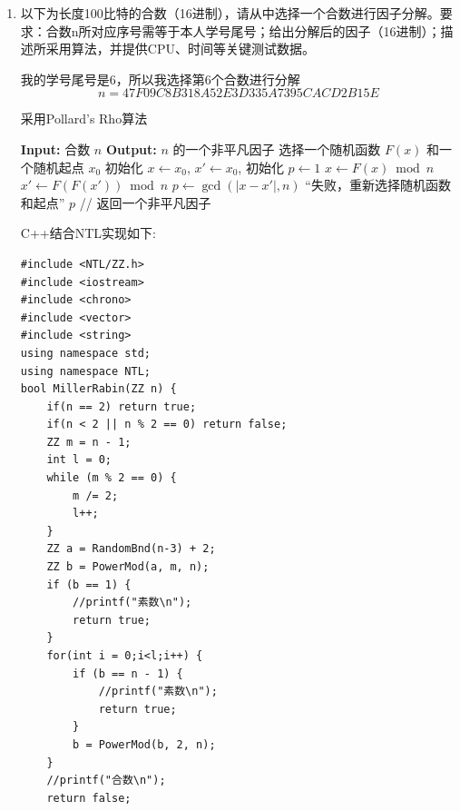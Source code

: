 \documentclass[12pt,a4paper]{article}
\begin{document}
\begin{enumerate}
如果这个d是第一问给定的\(p-q=2d\),那么显然没有必要说明\(n+d^2\)是完全平方数

如果这个d不是第一问给定的\(p-q=2d\),而是满足\(n+d^2\)是完全平方数的正整数，那么就会出现两种情况，一种是\(d = \frac{p-q}{2}\),另一种是\(d = \frac{n-1}{2}\)

鉴于题目说的“给定小的正整数d满足\(n+d^2\)是完全平方数”，个人认为这个d应该是第一种情况,因为第二种情况是一个平凡的解

所以说如果有一个小的正整数d满足\(n+d^2\)是完全平方数，那么只能满足\(d = \frac{p-q}{2}\)

那么我们已知 \(n\)和\(d\),就可以求出\(p\)和\(q\)
\[
p = q+2d,n=pq=q^2+2dq
\]
解这个二次方程就可以得到\(q\),再加上\(2d\)就可以得到\(p\)
\[
p = \frac{2d + \sqrt{4d^2+4n}}{2},q = \frac{-2d + \sqrt{4d^2+4n}}{2}
\]
\item 以下为长度100比特的合数（16进制），请从中选择一个合数进行因子分解。要求：合数n所对应序号需等于本人学号尾号；给出分解后的因子（16进制）；描述所采用算法，并提供CPU、时间等关键测试数据。

我的学号尾号是6，所以我选择第6个合数进行分解
\[
n = 47F09C8B318A52E3D335A7395CACD2B15E
\]

采用Pollard's Rho算法
\begin{algorithm}
\caption{Pollard's Rho算法}
\begin{algorithmic}[1]
\STATE \textbf{Input:} 合数 $n$
\STATE \textbf{Output:} $n$ 的一个非平凡因子
\STATE 选择一个随机函数 $F(x)$ 和一个随机起点 $x_0$
\STATE 初始化 $x \gets x_0$, $x' \gets x_0$,
\STATE 初始化 $p \gets 1$
    \STATE $x \gets F(x) \bmod n$
    \STATE $x' \gets F(F(x')) \bmod n$
    \STATE $p \gets \gcd(|x - x'|, n)$
\ENDWHILE
{}
    \RETURN ``失败，重新选择随机函数和起点''
\ELSE
    \RETURN $p$  // 返回一个非平凡因子
\ENDIF
\end{algorithmic}
\end{algorithm}
\newpage
C++结合NTL实现如下:
\begin{lstlisting}[style=mycpp]
#include <NTL/ZZ.h>
#include <iostream>
#include <chrono>
#include <vector>
#include <string>
using namespace std;
using namespace NTL;
bool MillerRabin(ZZ n) {
    if(n == 2) return true;
    if(n < 2 || n % 2 == 0) return false;
    ZZ m = n - 1;
    int l = 0;
    while (m % 2 == 0) {
        m /= 2;
        l++;
    }
    ZZ a = RandomBnd(n-3) + 2;
    ZZ b = PowerMod(a, m, n);
    if (b == 1) {
        //printf("素数\n");
        return true;
    }
    for(int i = 0;i<l;i++) {
        if (b == n - 1) {
            //printf("素数\n");
            return true;
        }
        b = PowerMod(b, 2, n);
    }
    //printf("合数\n");
    return false;


\end{lstlisting}
\end{enumerate}
\end{document}
